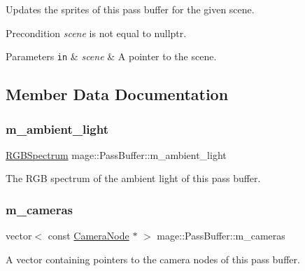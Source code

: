 Updates the sprites of this pass buffer for the given scene.

\begin{DoxyPrecond}{Precondition}
{\itshape scene} is not equal to {\ttfamily nullptr}. 
\end{DoxyPrecond}

\begin{DoxyParams}[1]{Parameters}
\mbox{\tt in}  & {\em scene} & A pointer to the scene. \\
\hline
\end{DoxyParams}


\subsection{Member Data Documentation}
\hypertarget{structmage_1_1_pass_buffer_a311ad723470aff0ad80c325d9ead07b9}{}\label{structmage_1_1_pass_buffer_a311ad723470aff0ad80c325d9ead07b9} 
\subsubsection{\texorpdfstring{m\+\_\+ambient\+\_\+light}{m\_ambient\_light}}
{\footnotesize\ttfamily \hyperlink{structmage_1_1_r_g_b_spectrum}{R\+G\+B\+Spectrum} mage\+::\+Pass\+Buffer\+::m\+\_\+ambient\+\_\+light\hspace{0.3cm}{\ttfamily [private]}}

The R\+GB spectrum of the ambient light of this pass buffer. \hypertarget{structmage_1_1_pass_buffer_a4885440342be6a2cd11002781704a63f}{}\label{structmage_1_1_pass_buffer_a4885440342be6a2cd11002781704a63f} 
\subsubsection{\texorpdfstring{m\+\_\+cameras}{m\_cameras}}
{\footnotesize\ttfamily vector$<$ const \hyperlink{classmage_1_1_camera_node}{Camera\+Node} $\ast$ $>$ mage\+::\+Pass\+Buffer\+::m\+\_\+cameras\hspace{0.3cm}{\ttfamily [private]}}

A vector containing pointers to the camera nodes of this pass buffer. \hypertarget{structmage_1_1_pass_buffer_a20f2a4518ea6121e6c9ae0ed9d263435}{}\label{structmage_1_1_pass_buffer_a20f2a4518ea6121e6c9ae0ed9d263435} 
